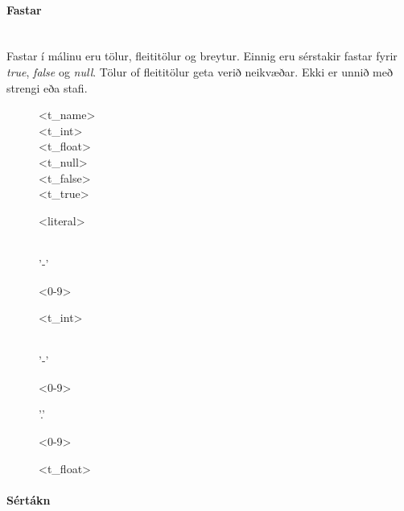 \documentclass{article}
\begin{document}
\clearpage
\paragraph{Fastar} ~\\

Fastar í málinu eru tölur, fleititölur og breytur. Einnig eru sérstakir fastar fyrir \emph{true}, \emph{false} og \emph{null}.
Tölur of fleititölur geta verið neikvæðar. Ekki er unnið með strengi eða stafi.

\begin{figure}[h!]
	\begin{syntdiag}
	\begin{stack}
		<t_name> \\ <t_int> \\ <t_float> \\ <t_null> \\ <t_false> \\ <t_true>
	\end{stack}
	\end{syntdiag}
	\caption{{\textless}literal{\textgreater}}
\end{figure}

\begin{figure}[h!]
	\begin{syntdiag}
	\begin{stack} \\
		'-' 
	\end{stack}
	\begin{rep}
		<0-9>
	\end{rep}
	\end{syntdiag}
	\caption{{\textless}t_int{\textgreater}}
\end{figure}

\begin{figure}[h!]
	\begin{syntdiag}
	\begin{stack} \\
		'-' 
	\end{stack}
	\begin{rep}
		<0-9>
	\end{rep}
	'.'
	\begin{rep}
		<0-9>
	\end{rep}
	\end{syntdiag}
	\caption{{\textless}t_float{\textgreater}}
\end{figure}

\paragraph{Sértákn} ~\\
\end{document}
